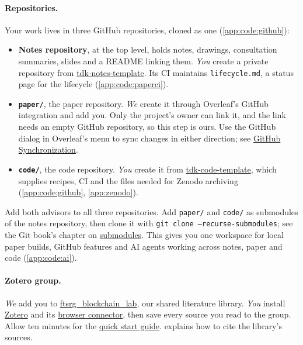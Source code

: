 \paragraph{Repositories.} Your work lives in three GitHub repositories, cloned as one (\cref{app:code:github}):
\begin{itemize}
  \item \textbf{Notes repository}, at the top level, holds notes, drawings, consultation summaries, slides and a README linking them. \emph{You} create a private repository from \href{https://github.com/BlackLight54/tdk-notes-template}{tdk-notes-template}. Its CI maintains \texttt{lifecycle.md}, a status page for the lifecycle (\cref{app:code:paperci}).
  \item \textbf{\texttt{paper/}}, the paper repository. \emph{We} create it through Overleaf's GitHub integration and add you. Only the project's owner can link it, and the link needs an empty GitHub repository, so this step is ours. Use the GitHub dialog in Overleaf's menu to sync changes in either direction; see \href{https://www.overleaf.com/learn/how-to/GitHub_Synchronization}{GitHub Synchronization}.
  \item \textbf{\texttt{code/}}, the code repository. \emph{You} create it from \href{https://github.com/BlackLight54/tdk-code-template}{tdk-code-template}, which supplies recipes, CI and the files needed for Zenodo archiving (\cref{app:code:github}, \cref{app:zenodo}).
\end{itemize}
Add both advisors to all three repositories. Add \texttt{paper/} and \texttt{code/} as submodules of the notes repository, then clone it with \texttt{git clone --recurse-submodules}; see the Git book's chapter on \href{https://git-scm.com/book/en/v2/Git-Tools-Submodules}{submodules}. This gives you one workspace for local paper builds, GitHub features and AI agents working across notes, paper and code (\cref{app:code:ai}).

\paragraph{Zotero group.} \emph{We} add you to \href{https://www.zotero.org/groups/6715800/ftsrg_blockchain_lab}{ftsrg\_blockchain\_lab}, our shared literature library. \emph{You} install \href{https://www.zotero.org/}{Zotero} and its \href{https://www.zotero.org/download/connectors}{browser connector}, then save every source you read to the group. Allow ten minutes for the \href{https://www.zotero.org/support/quick_start_guide}{quick start guide}.  explains how to cite the library's sources.


